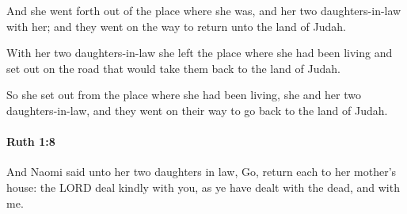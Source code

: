 			\begin{versebox}
					\item[BHS] 
					\item[LXX] 
					\item[ASV] And she went forth out of the place where she was, and her two daughters-in-law with her; and they went on the way to return unto the land of Judah.
					\item[NIV] With her two daughters-in-law she left the place where she had been living and set out on the road that would take them back to the land of Judah.
					\item[NRSV] So she set out from the place where she had been living, she and her two daughters-in-law, and they went on their way to go back to the land of Judah.
			\end{versebox}

		\paragraph{Ruth 1:8} %
			\label{RUTH-1-8}

			And Naomi said unto her two daughters in law, Go, return each to her mother’s house: the LORD deal kindly with you, as ye have dealt with the dead, and with me.

